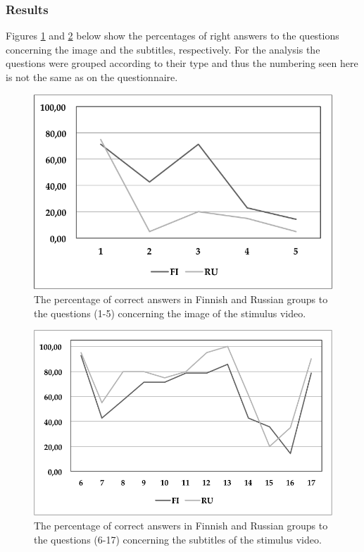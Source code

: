 \documentclass[output=paper]{langsci/langscibook}
\begin{document}
\subsubsection{Results}

Figures \ref{lang:fig:1} and \ref{lang:fig:2} below show the percentages of right answers to the questions concerning the image and the subtitles, respectively. For the analysis the questions were grouped according to their type and thus the numbering seen here is not the same as on the questionnaire. 

\begin{figure}[h]
 \includegraphics[width=\textwidth]{figures/Lang1.png}
 \caption{The percentage of correct answers in Finnish and Russian groups to the questions (1-5) concerning the image of the stimulus video.}
 \label{lang:fig:1}
\end{figure} 

\begin{figure}[h]
 \includegraphics[width=\textwidth]{figures/Lang2.png}
 \caption{The percentage of correct answers in Finnish and Russian groups to the questions (6-17) concerning the subtitles of the stimulus video.}
 \label{lang:fig:2}
\end{figure}
\end{document}
